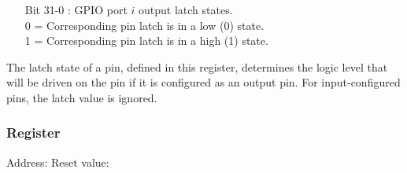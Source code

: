 \vspace{-2mm}
\begin{itemize}[leftmargin=18mm,labelsep=3mm,parsep=1.5mm]
    \item[\footnotesize Bit 31-0] : GPIO port $i$ output latch states.\\{\footnotesize
    0 = Corresponding pin latch is in a low (0) state.\\
    1 = Corresponding pin latch is in a high (1) state.}
\end{itemize}
\largepage
The latch state of a pin, defined in this register, determines the logic level that will be driven on the pin if it is configured as an output pin. For input-configured pins, the latch value is ignored.

\subsubsection{ Register}
\vspace{-3mm}
Address: \hfill
Reset value: \\[-1mm]
